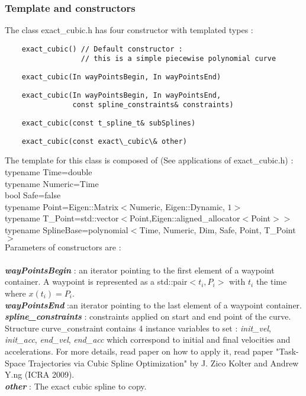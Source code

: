 \documentclass{article}
\begin{document}
    \subsubsection{Template and constructors}

    The class exact\_cubic.h has four constructor with templated types :\\
    \begin{lstlisting}
    exact_cubic() // Default constructor :
                  // this is a simple piecewise polynomial curve
    \end{lstlisting}
    \begin{lstlisting}
    exact_cubic(In wayPointsBegin, In wayPointsEnd)
    \end{lstlisting}
    \begin{lstlisting}
    exact_cubic(In wayPointsBegin, In wayPointsEnd,
                const spline_constraints& constraints)
    \end{lstlisting}
    \begin{lstlisting}
    exact_cubic(const t_spline_t& subSplines)
    \end{lstlisting}
    \begin{lstlisting}
    exact_cubic(const exact\_cubic\& other)
    \end{lstlisting}

    \noindent
    The template for this class is composed of (See applications of exact\_cubic.h) :\\
    typename Time=double\\
    typename Numeric=Time\\
    bool Safe=false\\
    typename Point=Eigen::Matrix$<$Numeric, Eigen::Dynamic, $1>$\\
    typename T\_Point=std::vector$<$Point,Eigen::aligned\_allocator$<$Point$> >$\\
    typename SplineBase=polynomial$<$Time, Numeric, Dim, Safe, Point, T\_Point$>$\\

    Parameters of constructors are :\\\\
    \textbf{\textit{wayPointsBegin}} : an iterator pointing to the first element of a waypoint container. A waypoint is represented as a std::pair$<t_i, P_i>$ with $t_i$ the time where $x(t_i)=P_i$.\\
    \textbf{\textit{wayPointsEnd}} :an iterator pointing to the last element of a waypoint container.\\
    \textbf{\textit{spline\_constraints}} : constraints applied on start and end point of the curve.\\
    Structure curve\_constraint contains 4 instance variables to set : \textit{init\_vel}, \textit{init\_acc}, \textit{end\_vel}, \textit{end\_acc} which correspond to initial and final velocities and accelerations. For more details, read paper on how to apply it, read paper "Task-Space Trajectories via Cubic Spline Optimization" by J. Zico Kolter and Andrew Y.ng (ICRA 2009).\\
    \textbf{\textit{other}} : The exact cubic spline to copy.\\\\
\end{document}
